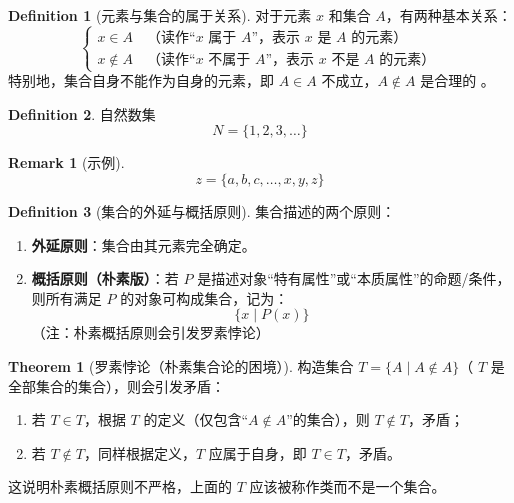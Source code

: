\documentclass[oneside]{book}
\theoremstyle{definition}
\newtheorem{definition}{Definition}[section]
\newtheorem{theorem}{Theorem}[section]
\newtheorem{remark}{Remark}[section]
\begin{document}
	\begin{definition}[元素与集合的属于关系]
		对于元素 \( x \) 和集合 \( A \)，有两种基本关系：  
		\[
		\begin{cases}
			x \in A \quad \text{（读作“}x\text{ 属于 }A\text{”，表示 }x\text{ 是 }A\text{ 的元素）} \\
			x \notin A \quad \text{（读作“}x\text{ 不属于 }A\text{”，表示 }x\text{ 不是 }A\text{ 的元素）}
		\end{cases}
		\]  
		特别地，集合自身不能作为自身的元素，即 \( A \in A \) 不成立，\( A \notin A \) 是合理的 。
	\end{definition}
	
	\begin{definition}自然数集 
		\[
		N = \{1, 2, 3, \dots\}
		\]  

	\end{definition}
	
	\begin{remark}[示例]
		\[
		z = \{a, b, c, \dots, x, y, z\}
		\]  
	\end{remark}
	
	\begin{definition}[集合的外延与概括原则]
		集合描述的两个原则：
		
		\begin{enumerate}
			\item \textbf{外延原则}：集合由其元素完全确定。  
			\item \textbf{概括原则（朴素版）}：若 \( P \) 是描述对象“特有属性”或“本质属性”的命题/条件，则所有满足 \( P \) 的对象可构成集合，记为：  
			\[
			\{ x \mid P(x) \}
			\]  
			（注：朴素概括原则会引发罗素悖论）
		\end{enumerate}
	\end{definition}
	
	\begin{theorem}[罗素悖论（朴素集合论的困境）]
		构造集合 \( T = \{ A \mid A \notin A \} \)（ \( T \) 是全部集合的集合），则会引发矛盾：  
		\begin{enumerate}
			\item 若 \( T \in T \)，根据 \( T \) 的定义（仅包含“\( A \notin A \)”的集合），则 \( T \notin T \)，矛盾；  
			\item 若 \( T \notin T \)，同样根据定义，\( T \) 应属于自身，即 \( T \in T \)，矛盾。  
		\end{enumerate}  
		这说明朴素概括原则不严格，上面的 \( T \) 应该被称作类而不是一个集合。
	\end{theorem}
	
\end{document}
